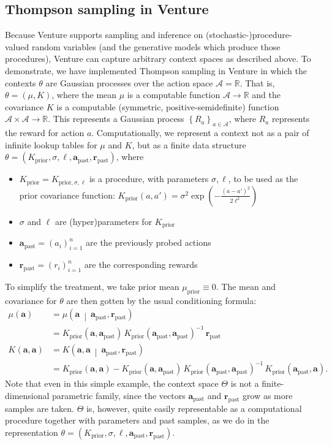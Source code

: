 \documentclass{article} %
\newcommand{\past}{{\textrm{past}}}
\newcommand{\prior}{{\textrm{prior}}}
\newcommand{\Acal}{\mathcal{A}}
\newcommand{\R}{\mathbb{R}}
\newcommand{\abf}{\mathbf{a}}
\newcommand{\rbf}{\mathbf{r}}
\newcommand{\pn}[1]{\left( #1 \right)}
\newcommand{\br}[1]{\left\{ #1 \right\}}
\newcommand{\mvert}{\ \middle\vert\ }
\begin{document}
\subsection{Thompson sampling in Venture}
Because Venture supports sampling and inference on (stochastic-)procedure-valued random variables (and the generative models which produce those procedures), Venture can capture arbitrary context spaces as described above.
To demonstrate, we have implemented Thompson sampling in Venture in which the contexts $\theta$ are Gaussian processes over the action space $\Acal = \R$.
That is, $\theta = (\mu, K)$, where the mean $\mu$ is a computable function $\Acal \to \R$ and the covariance $K$ is a computable (symmetric, positive-semidefinite) function $\Acal \times \Acal \to \R$.
This represents a Gaussian process $\br{R_a}_{a \in \Acal}$, where $R_a$ represents the reward for action $a$.
Computationally, we represent a context not as a pair of infinite lookup tables for $\mu$ and $K$, but as a finite data structure $\theta = (K_\prior, \sigma, \ell, \abf_\past, \rbf_\past)$, where
\begin{itemize}
  \item $K_\prior = K_{\prior,\sigma,\ell}$ is a procedure, with parameters $\sigma,\ell$, to be used as the prior covariance function: $K_\prior(a,a') = \sigma^2 \exp\pn{-\frac{(a-a')^2}{2\ell^2}}$
  \item $\sigma$ and $\ell$ are (hyper)parameters for $K_\prior$
  \item $\abf_\past = \pn{a_i}_{i=1}^{n}$ are the previously probed actions
  \item $\rbf_\past = \pn{r_i}_{i=1}^{n}$ are the corresponding rewards
\end{itemize}
To simplify the treatment, we take prior mean $\mu_\prior \equiv 0$.  The mean and covariance for $\theta$ are then gotten by the usual conditioning formula:
\begin{align*}
  \mu(\abf)
  &= \mu\pn{\abf \mvert \abf_\past, \rbf_\past} \\
  &= K_\prior(\abf, \abf_\past)
     \,K_\prior(\abf_\past, \abf_\past)^{-1}
     \,\rbf_\past \\
  K(\abf, \abf)
  &= K\pn{\abf, \abf \mvert \abf_\past, \rbf_\past} \\
  &= K_\prior(\abf, \abf)
     - K_\prior(\abf, \abf_\past)
       \,K_\prior(\abf_\past, \abf_\past)^{-1}
       \,K_\prior(\abf_\past, \abf).
\end{align*}
Note that even in this simple example, the context space $\Theta$ is not a finite-dimensional parametric family, since the vectors $\abf_\past$ and $\rbf_\past$ grow as more samples are taken.
$\Theta$ is, however, quite easily representable as a computational procedure together with parameters and past samples, as we do in the representation $\theta = (K_\prior, \sigma, \ell, \abf_\past, \rbf_\past)$.
\end{document}
